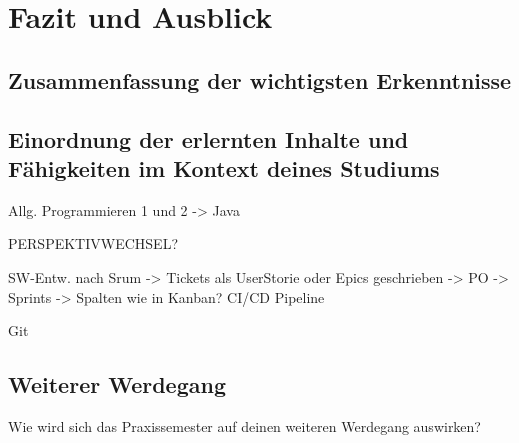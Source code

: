 \chapter{Fazit und Ausblick}


\section{Zusammenfassung der wichtigsten Erkenntnisse}


\section{Einordnung der erlernten Inhalte und Fähigkeiten im Kontext deines Studiums}

Allg. Programmieren 1 und 2
-> Java



PERSPEKTIVWECHSEL?

SW-Entw. nach Srum
-> Tickets als UserStorie oder Epics geschrieben
-> PO
-> Sprints
-> Spalten wie in Kanban?
CI/CD Pipeline 

Git




\section{Weiterer Werdegang}
Wie wird sich das Praxissemester auf deinen weiteren Werdegang auswirken?